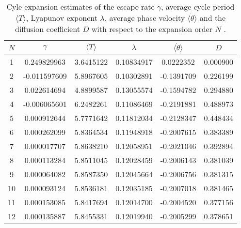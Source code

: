 \begin{table}
	\begin{tabular}{c|c|c|c|c|c}
	 $N$ & $\gamma$ & $\langle T \rangle$ & $\lambda$ & $\langle \dot{\theta} \rangle$ & $D$ \\ 
	\hline
	1 & 0.249829963 & 3.6415122 & 0.10834917 & 0.0222352 & 0.000900 \\ 
 	2 & -0.011597609 & 5.8967605 & 0.10302891 & -0.1391709 & 0.226199 \\ 
 	3 & 0.022614694 & 4.8899587 & 0.13055574 & -0.1594782 & 0.294880 \\ 
 	4 & -0.006065601 & 6.2482261 & 0.11086469 & -0.2191881 & 0.488973 \\ 
 	5 & 0.000912644 & 5.7771642 & 0.11812034 & -0.2128347 & 0.448434 \\ 
 	6 & 0.000262099 & 5.8364534 & 0.11948918 & -0.2007615 & 0.383389 \\ 
 	7 & 0.000017707 & 5.8638210 & 0.12058951 & -0.2021046 & 0.392894 \\ 
 	8 & 0.000113284 & 5.8511045 & 0.12028459 & -0.2006143 & 0.381039 \\ 
 	9 & 0.000064082 & 5.8587350 & 0.12045664 & -0.2006756 & 0.381315 \\ 
 	10 & 0.000093124 & 5.8536181 & 0.12035185 & -0.2007018 & 0.381465 \\ 
 	11 & 0.000153085 & 5.8417694 & 0.12014700 & -0.2004520 & 0.377156 \\ 
 	12 & 0.000135887 & 5.8455331 & 0.12019940 & -0.2005299 & 0.378651 \\ 
 	\end{tabular}
	\caption{Cyle expansion estimates of the escape rate $\gamma$, average 
    cycle period $\langle T \rangle$, Lyapunov exponent $\lambda$, average 
    phase velocity $\langle \dot{\theta} \rangle$ and the diffusion coefficient 
    $D$ with respect to the expansion order $N$ .}
	\label{t-DynamicalAveragesNoGrammar}
\end{table}
